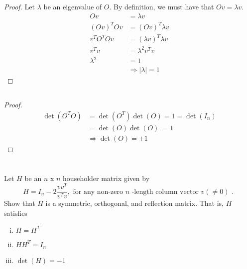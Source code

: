 \documentclass[12pt]{article}
\newcommand{\RA}{\Rightarrow}
\begin{document}
	\subsection{}
		\begin{proof}
			Let $ \lambda $ be an eigenvalue of $ O $. By definition, we must have that $ Ov=\lambda v $. 
			\begin{align*}
				 Ov&=\lambda v\\
				 (Ov)^TOv&=(Ov)^T \lambda v\\
				 v^TO^TOv&=(\lambda v)^T\lambda v\\
				 v^Tv&=\lambda^2v^Tv\\
				 \lambda^2&=1\\
				 &\RA |\lambda|=1
			\end{align*}
		\end{proof}
	
	\subsection{}
		\begin{proof}
			\begin{align*}
				\det(O^TO)& = \det(O^T)\det(O) = 1 = \det(I_n) \\
				&= \det(O)\det(O)\ = 1 \\
				&\RA \det(O)=\pm 1
			\end{align*}
			
		\end{proof}
	
	\section{}
	Let $H$ be an $n$ x $n$ householder matrix given by
	$$
	H=I_{n}-2 \frac{v v^{T}}{v^{T} v}, \text { for any non-zero } n \text { -length column vector } v( \neq 0) \text { . }
	$$
	Show that $H$ is a symmetric, orthogonal, and reflection matrix. That is, $H$ satisfies
	\begin{enumerate}[i)]
		\item $H=H^{T} $
		\item $H H^{T}=I_{n} $
		\item  $\det(H)=-1$
	\end{enumerate}
\end{document}
